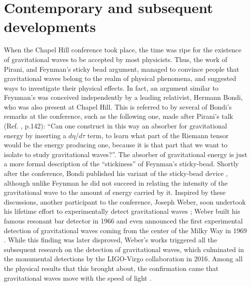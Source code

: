 \documentclass{ws-procs961x669}            %
\begin{document}
\section{Contemporary and subsequent developments}\label{Developments}

When the Chapel Hill conference took place, the time was ripe for
the existence of gravitational waves to be accepted by most
physicists. Thus, the work of Pirani, and Feynman's sticky bead
argument, managed to convince people that gravitational waves
belong to the realm of physical phenomena, and suggested ways to
investigate their physical effects. In fact, an argument similar
to Feynman's was conceived independently by a leading relativist,
Hermann Bondi, who was also present at Chapel Hill. This is
referred to by several of Bondi's remarks at the conference, such
as the following one, made after Pirani's talk (Ref.
, p.142): ``Can one construct in this way an
absorber for gravitational energy by inserting a $d\eta/d\tau$
term, to learn what part of the Riemann tensor would be the energy
producing one, because it is that part that we want to isolate to
study gravitational waves?''. The absorber of gravitational energy
is just a more formal description of the ``stickiness'' of
Feynman's sticky-bead. Shortly after the conference, Bondi
published his variant of the sticky-bead device \cite{Bondi},
although unlike Feynman he did not succeed in relating the
intensity of the gravitational wave to the amount of energy
carried by it. Inspired by these discussions, another participant
to the conference, Joseph Weber, soon undertook his lifetime
effort to experimentally detect gravitational waves \cite{Weber1};
Weber built his famous resonant bar detector in 1966 \cite{Weber2}
and even announced the first experimental detection of
gravitational waves coming from the center of the Milky Way in
1969 \cite{Weber3}. While this finding was later disproved,
Weber's works triggered all the subsequent research on the
detection of gravitational waves, which culminated in the
monumental detections by the LIGO-Virgo collaboration in
2016\cite{LIGOScientific:2016aoc}. Among all the physical results
that this brought about, the confirmation came that gravitational
waves move with the speed of light \cite{LIGOScientific:2017zic}.
\end{document}
